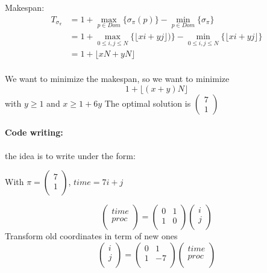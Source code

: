 \documentclass{article}
\begin{document}
Makespan: 
\begin{align*}
T_{\sigma_\pi} &= 1 + \max_{p\in Dom} \{ \sigma_\pi (p)\} - \min_{p \in Dom} \{\sigma_\pi\}\\
&= 1 + \max_{0\leq i,j \leq N} \{ \lfloor xi+yj \rfloor)\} - \min_{0\leq i,j \leq N} \{\lfloor xi+yj \rfloor\}\\
&= 1 + \lfloor xN+yN\rfloor\\
\end{align*}

We want to minimize the makespan, so we want to minimize
\[ 1 + \lfloor (x+y)N\rfloor \] with $y\geq 1$ and $x\geq 1 + 6y$
The optimal solution is $\begin{pmatrix}
7\\1
\end{pmatrix}$

\paragraph{Code writing:}the idea is to write under the form:
\begin{algorithm}
\end{algorithm}

With $\pi =\begin{pmatrix}
7\\1\\
\end{pmatrix}$, $time=7i+j$

\[\begin{pmatrix}
time\\
proc\\
\end{pmatrix}
=
\begin{pmatrix}
0&1\\1&0\\
\end{pmatrix}
\begin{pmatrix}
i\\j\\
\end{pmatrix}
\]
Transform old coordinates in term of new ones
\[
\begin{pmatrix}
i\\j\\
\end{pmatrix}
=
\begin{pmatrix}
0&1\\
1&-7\\
\end{pmatrix}
\begin{pmatrix}
time\\
proc\\
\end{pmatrix}
\]
\end{document}
